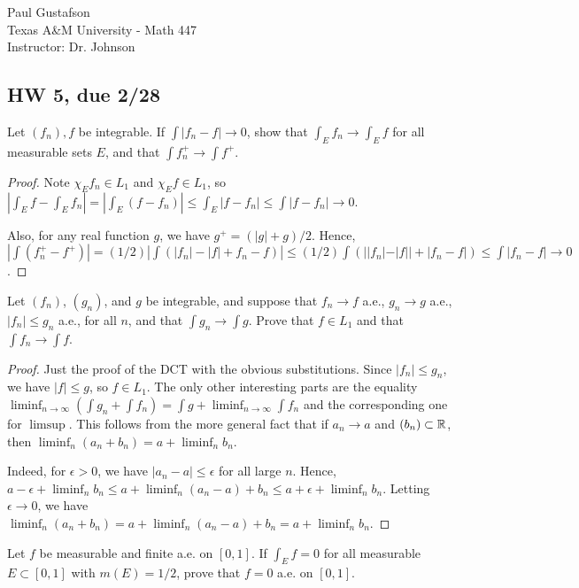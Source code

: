\documentclass{article}
\begin{document}
\noindent Paul Gustafson\\
\noindent Texas A\&M University - Math 447\\ 
\noindent Instructor: Dr. Johnson

\subsection*{HW 5, due 2/28}
 Let $(f_n), f$ be integrable. If $\int |f_n - f| \to 0$, show that $\int_E f_n \to \int_E f$ for all measurable sets $E$, and that $\int f_n^+ \to \int f^+$.
\begin{proof}
Note $\chi_E f_n \in L_1$ and $\chi_E f \in L_1$, so $|\int_E f - \int_E f_n| = |\int_E (f - f_n)| \le \int_E |f- f_n| \le \int |f - f_n| \to 0$.

Also, for any real function $g$, we have $g^+  = (|g| + g)/2$. Hence, $|\int (f_n^+ - f^+)| =  (1/2)|\int (|f_n| - |f| + f_n - f)| 
\le (1/2) \int (||f_n| - |f|| + |f_n - f|) \le \int |f_n - f| \to 0$.
\end{proof}
 Let $(f_n)$, $(g_n)$, and $g$ be integrable, and suppose that $f_n \to f$ a.e., $g_n \to g$ a.e., $|f_n| \le g_n$ a.e., for all $n$, and  that $\int g_n \to \int g$. Prove that $f \in L_1$ and that $\int f_n \to \int f$.
\begin{proof} 
Just the proof of the DCT with the obvious substitutions.  Since $|f_n| \le g_n$, we have $|f| \le g$, so $f \in L_1$. The only other interesting parts are the equality $\liminf_{n \to \infty} (\int g_n + \int f_n) = \int g + \liminf_{n \to \infty} \int f_n$ and the corresponding one for $\limsup$. This follows from the more general fact that if $a_n \to a$ and $(b_n) \subset \mathbb{R}$, then $\liminf_n (a_n + b_n) = a + \liminf_n b_n$. 

Indeed, for $\epsilon > 0$, we have $|a_n - a| \le \epsilon$ for all large $n$. Hence, $a - \epsilon + \liminf_n b_n \le a + \liminf_n (a_n - a) + b_n \le a + \epsilon + \liminf_n b_n$.  Letting  $\epsilon \to 0$, we have $\liminf_n (a_n + b_n) = a + \liminf_n (a_n - a) + b_n = a + \liminf_n b_n$.
\end{proof}
 Let $f$ be measurable and finite a.e. on $[0,1]$. If $\int_E f = 0$ for all measurable $E \subset [0,1]$ with $m(E) = 1/2$, prove that $f = 0$ a.e. on $[0,1]$.
\end{document}
